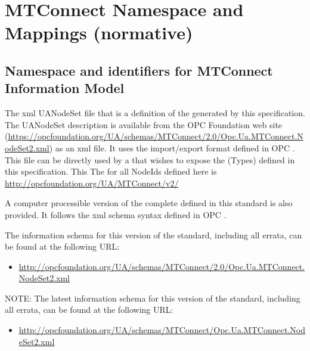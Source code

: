 
\section{MTConnect Namespace and  Mappings \newline (normative)}

\subsection{Namespace and identifiers for MTConnect  Information Model}

The \gls{xml} \gls{UANodeSet} file that is a definition of the  generated by this specification. The \gls{UANodeSet} description is available from the OPC Foundation web site (\footnotesize{\url{https://opcfoundation.org/UA/schemas/MTConnect/2.0/Opc.Ua.MTConnect.NodeSet2.xml}}) as an \gls{xml} file. It uses the import/export format defined in OPC \cite{UAPart6}. This file can be directly used by a  that wishes to expose the  (\glspl{Type}) defined in this specification. This The  for all \glspl{NodeId} defined here is \url{http://opcfoundation.org/UA/MTConnect/v2/}


A computer processible version of the complete  defined in this standard is also provided. It follows the \gls{xml}  schema syntax defined in OPC \cite{UAPart6}.

The information schema for this version of the standard, including all errata, can be found at the following URL:%
\begin{itemize}
  \item \footnotesize{\url{http://opcfoundation.org/UA/schemas/MTConnect/2.0/Opc.Ua.MTConnect.NodeSet2.xml}}
\end{itemize}

NOTE:  The latest information schema for this version of the standard, including all errata, can be found at the following URL:%
\begin{itemize}
  \item \footnotesize{\url{http://opcfoundation.org/UA/schemas/MTConnect/Opc.Ua.MTConnect.NodeSet2.xml}}
\end{itemize}


